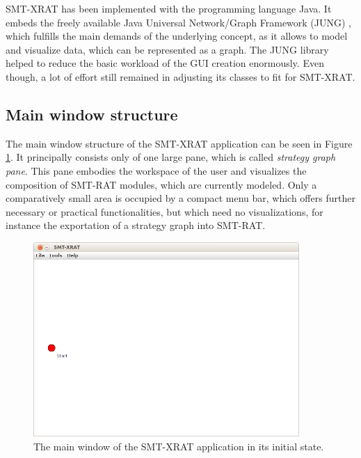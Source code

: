 SMT-XRAT has been implemented with the programming language Java. It embeds the freely available Java Universal Network/Graph Framework (JUNG) \cite{JUNG}, which fulfills the main demands of the underlying concept, as it allows to model and visualize data, which can be represented as a graph. The JUNG library helped to reduce the basic workload of the GUI creation enormously. Even though, a lot of effort still remained in adjusting its classes to fit for SMT-XRAT.

\subsection{Main window structure}
\label{sec:main_window_structure_of_smt-xrat}
The main window structure of the SMT-XRAT application can be seen in Figure \ref{fig:smt-xrat_main_window}. It principally consists only of one large pane, which is called \emph{strategy graph pane}. This pane embodies the workspace of the user and visualizes the composition of SMT-RAT modules, which are currently modeled. Only a comparatively small area is occupied by a compact menu bar, which offers further necessary or practical functionalities, but which need no visualizations, for instance the exportation of a strategy graph into SMT-RAT.
\begin{figure}
  \begin{center}
    \includegraphics[width=0.9\textwidth]{graphics/smt-xrat_main_window.png}
  \end{center}
  \caption{The main window of the SMT-XRAT application in its initial state.}
  \label{fig:smt-xrat_main_window}
\end{figure}

